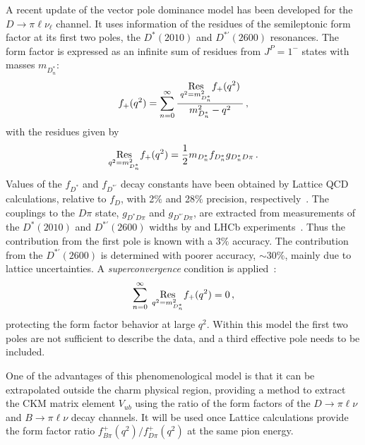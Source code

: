 A recent update of the vector pole dominance model has been developed for the $D \to \pi \ell \nu_\ell$ channel\cite{Becirevic:2014kaa}.
It uses information of the residues of the semileptonic form factor at its first two poles, the $D^\ast(2010)$ 
and $D^{\ast '}(2600)$ resonances.  
The form factor is expressed as an infinite sum of residues from $J^P =1^-$ states with masses $m_{D^\ast_n}$: 
\begin{eqnarray}
f_+(q^2) = \sum_{n=0}^\infty { \; \displaystyle{\underset{q^2= m_{D^\ast_n}^2}{\rm Res}} f_+(q^2)\;\over m_{D^\ast_n}^2-q^2} \,,
\label{ThreePole}
\end{eqnarray}
with the residues given by 
\begin{eqnarray}
\displaystyle{\underset{q^2=m_{D_n^\ast}^2}{\rm Res}} f_+(q^2)= {1\over 2} m_{D_n^\ast} f_{D_n^\ast} g_{D_n^\ast D\pi}\,. 
\label{Residua}
\end{eqnarray}
Values of the $f_{D^\ast}$ and $f_{D^{\ast '}}$ decay constants have been obtained by Lattice QCD calculations, 
relative to $f_{D}$, with 2$\%$ and 28$\%$ precision, respectively~\cite{Becirevic:2014kaa}. 
The couplings to the $D\pi$ state, $g_{D^\ast D\pi}$ and $g_{D^{\ast '} D\pi}$, are extracted from measurements of the $D^\ast(2010)$ and  $D^{\ast '}(2600)$ widths by \babar and LHCb experiments~\cite{Lees:2013uxa,delAmoSanchez:2010vq,Aaij:2013sza}. 
Thus the contribution from the first pole is known with a $3\%$ accuracy. 
The contribution from the $D^{\ast '}(2600)$ is determined with poorer accuracy, $\sim 30\%$, mainly due to lattice uncertainties.  A {\it superconvergence} condition is applied~\cite{Burdman:1996kr}: 
\begin{eqnarray}
\sum_{n=0}^\infty { \; \displaystyle{\underset{q^2=m_{D^\ast_n}^2}{\rm Res}} f_+(q^2) }= 0 \,,
\label{superconvergence}
\end{eqnarray}
protecting the form factor behavior at large $q^2$.
Within this model the first two poles are not sufficient to describe the data, and a third effective pole needs to be included. 

One of the advantages of this phenomenological model 
is that it can be extrapolated outside the charm physical region, providing a method to 
extract the CKM matrix element $V_{ub}$ using the ratio of the form factors of the 
$D\to \pi\ell \nu$ and $B\to \pi\ell \nu$ decay channels. It will be used once Lattice calculations provide
the form factor ratio $f^{+}_{B\pi}(q^2)/f^{+}_{D\pi}(q^2)$ at the same pion energy. 

